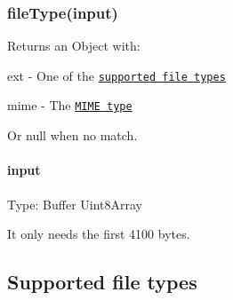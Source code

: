 \subsubsection*{file\+Type(input)}

Returns an {\ttfamily Object} with\+:


\begin{DoxyItemize}
\item {\ttfamily ext} -\/ One of the \href{#supported-file-types}{\tt supported file types}
\item {\ttfamily mime} -\/ The \href{http://en.wikipedia.org/wiki/Internet_media_type}{\tt M\+I\+ME type}
\end{DoxyItemize}

Or {\ttfamily null} when no match.

\paragraph*{input}

Type\+: {\ttfamily Buffer} {\ttfamily Uint8\+Array}

It only needs the first 4100 bytes.

\subsection*{Supported file types}


